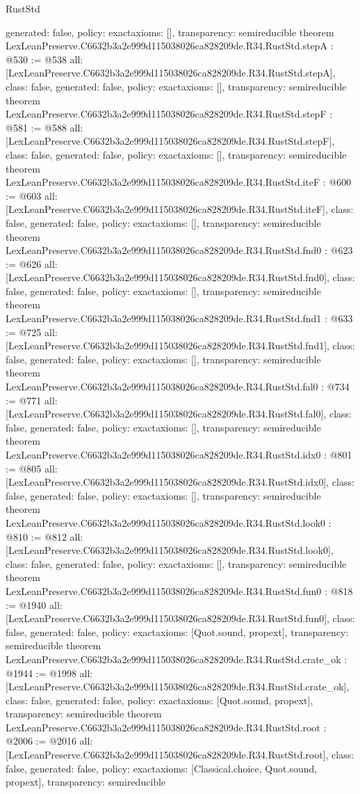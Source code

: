\begin{lexlean}{RustStd}
\begin{coremodule}
{  generated: false,
  policy: exact{axioms: []},
  transparency: semireducible
}
theorem LexLeanPreserve.C6632b3a2e999d115038026ca828209de.R34.RustStd.stepA : @530 := @538 {
  all: [LexLeanPreserve.C6632b3a2e999d115038026ca828209de.R34.RustStd.stepA],
  class: false,
  generated: false,
  policy: exact{axioms: []},
  transparency: semireducible
}
theorem LexLeanPreserve.C6632b3a2e999d115038026ca828209de.R34.RustStd.stepF : @581 := @588 {
  all: [LexLeanPreserve.C6632b3a2e999d115038026ca828209de.R34.RustStd.stepF],
  class: false,
  generated: false,
  policy: exact{axioms: []},
  transparency: semireducible
}
theorem LexLeanPreserve.C6632b3a2e999d115038026ca828209de.R34.RustStd.iteF : @600 := @603 {
  all: [LexLeanPreserve.C6632b3a2e999d115038026ca828209de.R34.RustStd.iteF],
  class: false,
  generated: false,
  policy: exact{axioms: []},
  transparency: semireducible
}
theorem LexLeanPreserve.C6632b3a2e999d115038026ca828209de.R34.RustStd.fnd0 : @623 := @626 {
  all: [LexLeanPreserve.C6632b3a2e999d115038026ca828209de.R34.RustStd.fnd0],
  class: false,
  generated: false,
  policy: exact{axioms: []},
  transparency: semireducible
}
theorem LexLeanPreserve.C6632b3a2e999d115038026ca828209de.R34.RustStd.fnd1 : @633 := @725 {
  all: [LexLeanPreserve.C6632b3a2e999d115038026ca828209de.R34.RustStd.fnd1],
  class: false,
  generated: false,
  policy: exact{axioms: []},
  transparency: semireducible
}
theorem LexLeanPreserve.C6632b3a2e999d115038026ca828209de.R34.RustStd.fal0 : @734 := @771 {
  all: [LexLeanPreserve.C6632b3a2e999d115038026ca828209de.R34.RustStd.fal0],
  class: false,
  generated: false,
  policy: exact{axioms: []},
  transparency: semireducible
}
theorem LexLeanPreserve.C6632b3a2e999d115038026ca828209de.R34.RustStd.idx0 : @801 := @805 {
  all: [LexLeanPreserve.C6632b3a2e999d115038026ca828209de.R34.RustStd.idx0],
  class: false,
  generated: false,
  policy: exact{axioms: []},
  transparency: semireducible
}
theorem LexLeanPreserve.C6632b3a2e999d115038026ca828209de.R34.RustStd.look0 : @810 := @812 {
  all: [LexLeanPreserve.C6632b3a2e999d115038026ca828209de.R34.RustStd.look0],
  class: false,
  generated: false,
  policy: exact{axioms: []},
  transparency: semireducible
}
theorem LexLeanPreserve.C6632b3a2e999d115038026ca828209de.R34.RustStd.fun0 : @818 := @1940 {
  all: [LexLeanPreserve.C6632b3a2e999d115038026ca828209de.R34.RustStd.fun0],
  class: false,
  generated: false,
  policy: exact{axioms: [Quot.sound, propext]},
  transparency: semireducible
}
theorem LexLeanPreserve.C6632b3a2e999d115038026ca828209de.R34.RustStd.crate_ok : @1944 := @1998 {
  all: [LexLeanPreserve.C6632b3a2e999d115038026ca828209de.R34.RustStd.crate_ok],
  class: false,
  generated: false,
  policy: exact{axioms: [Quot.sound, propext]},
  transparency: semireducible
}
theorem LexLeanPreserve.C6632b3a2e999d115038026ca828209de.R34.RustStd.root : @2006 := @2016 {
  all: [LexLeanPreserve.C6632b3a2e999d115038026ca828209de.R34.RustStd.root],
  class: false,
  generated: false,
  policy: exact{axioms: [Classical.choice, Quot.sound, propext]},
  transparency: semireducible
}


\end{coremodule}
\end{lexlean}
